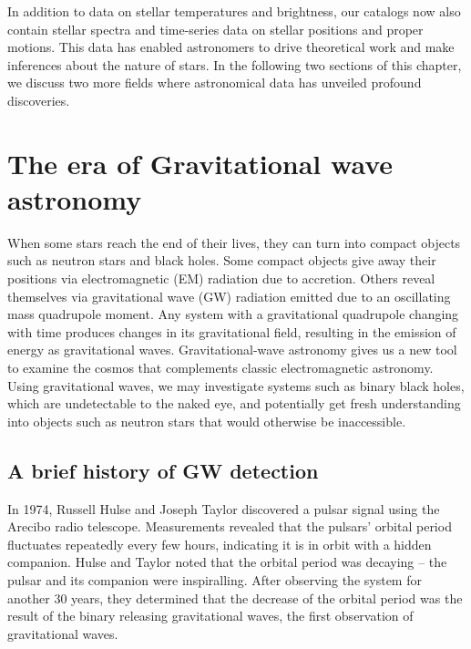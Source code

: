 In addition to data on stellar temperatures and brightness, our catalogs now also contain stellar spectra and time-series data on stellar positions and proper motions.
This data has enabled astronomers to drive theoretical work and make inferences about the nature of stars.
In the following two sections of this chapter, we discuss two more fields where astronomical data has unveiled profound discoveries. 



\section{The era of Gravitational wave astronomy}

When some stars reach the end of their lives, they can turn into compact objects such as neutron stars and black holes. 
Some compact objects give away their positions via electromagnetic (EM) radiation due to accretion. 
Others reveal themselves via gravitational wave (GW) radiation emitted due to an oscillating mass quadrupole moment.
Any system with a gravitational quadrupole changing with time produces changes in its gravitational field, resulting in the emission of energy as gravitational waves.
Gravitational-wave astronomy gives us a new tool to examine the cosmos that complements classic electromagnetic astronomy.
Using gravitational waves, we may investigate systems such as binary black holes, which are undetectable to the naked eye, and potentially get fresh understanding into objects such as neutron stars that would otherwise be inaccessible.


\subsection{A brief history of GW detection}
In 1974, Russell Hulse and Joseph Taylor discovered a pulsar signal using the Arecibo radio telescope.
Measurements revealed that the pulsars' orbital period fluctuates repeatedly every few hours, indicating it is in orbit with a hidden companion.
Hulse and Taylor noted that the orbital period was decaying -- the pulsar and its companion were inspiralling.
After observing the system for another 30 years, they determined that the decrease of the orbital period was the result of the binary releasing gravitational waves, the first observation of gravitational waves.

